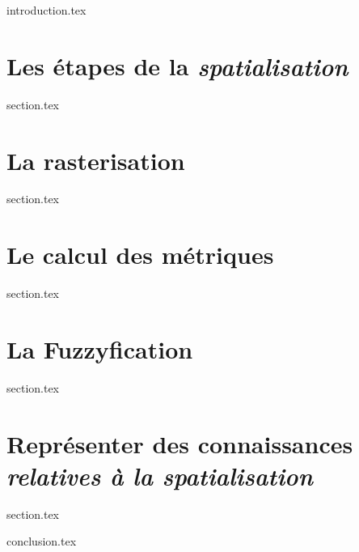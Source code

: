 \chaptertoc{}

\label{chap:07-int}
{introduction.tex}

\section{Les étapes de la \emph{spatialisation}}
\label{chap:07-sec1}
{section.tex}

\section{La rasterisation}
\label{chap:07-sec2}
{section.tex}

\section{Le calcul des métriques}
\label{chap:07-sec3}
{section.tex}

\section{La Fuzzyfication}
\label{chap:07-sec4}
{section.tex}

\section{Représenter des connaissances \emph{relatives à la spatialisation}}
\label{chap:07-sec5}
{section.tex}

\label{chap:07-cnc}
{conclusion.tex}

